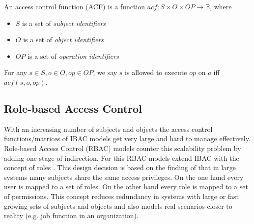 \documentclass[twoside, openright, 12pt]{book}
\begin{document}
\begin{definition}
An access control function (ACF) is a function ${acf}: S \times O \times OP \rightarrow \mathbb{B}$, where
\vspace{-2mm}
\begin{itemize}
\item $S$ is a set of \textit{subject identifiers}
\item $O$ is a set of \textit{object identifiers}
\item $\mathit{OP}$ is a set of \textit{operation identifiers}
\end{itemize} 
\vspace{-2mm}
For any $s \in S, o \in O, op \in \mathit{OP}$, we say $s$ is allowed to execute $op$ on $o$ iff $acf(s, o, op)$.
\end{definition}



\subsection{Role-based Access Control}
\label{RBAC}
With an increasing number of subjects and objects the access control functions/matrices of IBAC models get very large and hard to manage effectively.
Role-based Access Control (RBAC) models counter this scalability problem by adding one stage of indirection.
For this RBAC models extend IBAC with the concept of roles \citep{Sandhu96}.
This design decision is based on the finding of \cite{Sandhu96} that in large systems many subjects share the same access privileges.
On the one hand every user is mapped to a set of roles.
On the other hand every role is mapped to a set of permissions.
This concept reduces redundancy in systems with large or fast growing sets of subjects and objects and also models real scenarios closer to reality (e.g. job function in an organization).
\end{document}
